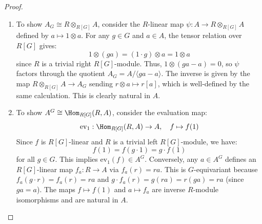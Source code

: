 \begin{proof}
    \begin{enumerate}
        \item To show $A_G \cong R \otimes_{R[G]} A$, consider the $R$-linear map 
        $\psi: A \to R \otimes_{R[G]} A$ defined by $a \mapsto 1 \otimes a$. 
        For any $g \in G$ and $a \in A$, the tensor relation over $R[G]$ gives:
        $$1 \otimes (ga) = (1 \cdot g) \otimes a = 1 \otimes a$$
        since $R$ is a trivial right $R[G]$-module. Thus, $1 \otimes (ga - a) = 0$, so $\psi$ factors through the quotient $A_G = A / \langle ga - a \rangle$. 
        The inverse is given by the map $R \otimes_{R[G]} A \to A_G$ sending $r \otimes a \mapsto r[a]$, which is well-defined by the same calculation. 
        This is clearly natural in $A$.

        \item To show $A^G \cong \Hom_{R[G]}(R, A)$, consider the evaluation map:
        $$\text{ev}_1: \Hom_{R[G]}(R, A) \to A, \quad f \mapsto f(1)$$
        Since $f$ is $R[G]$-linear and $R$ is a trivial left $R[G]$-module, we have:
        $$f(1) = f(g \cdot 1) = g \cdot f(1)$$
        for all $g \in G$. This implies $\text{ev}_1(f) \in A^G$. 
        Conversely, any $a \in A^G$ defines an $R[G]$-linear map $f_a: R \to A$ via $f_a(r) = ra$. This is $G$-equivariant because $f_a(g \cdot r) = f_a(r) = ra$ and $g \cdot f_a(r) = g(ra) = r(ga) = ra$ (since $ga=a$). 
        The maps $f \mapsto f(1)$ and $a \mapsto f_a$ are inverse $R$-module isomorphisms and are natural in $A$.
    \end{enumerate}
\end{proof}